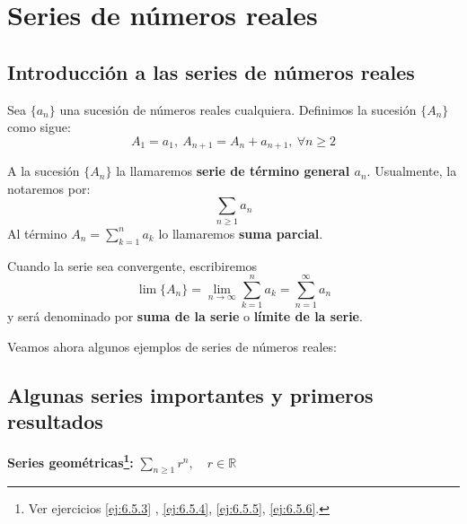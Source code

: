 \chapter{Series de números reales}\label{chp:Tema9}


\section{Introducción a las series de números reales}
\begin{definicion}
    Sea $\{a_n\}$ una sucesión de números reales cualquiera. Definimos la sucesión $\{A_n\}$ como sigue:
    \begin{equation*}
        A_1 = a_1, ~ A_{n+1} = A_n + a_{n+1}, ~\forall n \geq 2
    \end{equation*}
    
    A la sucesión $\{A_n\}$ la llamaremos \textbf{serie de término general $a_n$}. Usualmente, la notaremos por:
    \begin{equation*}
        \sum_{n \geq 1} a_n
    \end{equation*}
    Al término $A_n = \displaystyle\sum_{k = 1}^{n} a_k$ lo llamaremos \textbf{suma parcial}.

    Cuando la serie sea convergente, escribiremos
    \begin{equation*}
        \lim \{A_n\} = \lim_{n \to \infty} \displaystyle\sum_{k = 1}^{n} a_k = \sum_{n = 1}^{\infty} a_n 
    \end{equation*}
    y será denominado por \textbf{suma de la serie} o \textbf{límite de la serie}.

\end{definicion}

Veamos ahora algunos ejemplos de series de números reales:


%

\section{Algunas series importantes y primeros resultados}
\noindent\textbf{Series geométricas\footnote{ Ver ejercicios \ref{ej:6.5.3} , \ref{ej:6.5.4}, \ref{ej:6.5.5}, \ref{ej:6.5.6}.}:}
$\displaystyle \sum_{n \geq 1} r^n,\quad r \in \mathbb{R}$

